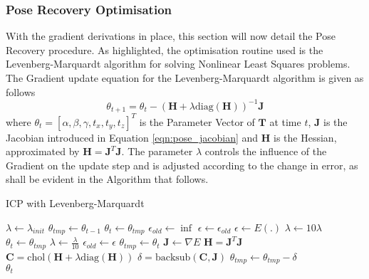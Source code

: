 \subsubsection{Pose Recovery Optimisation}
\label{subsub:moseg_static_camera_poserec_opt}
With the gradient derivations in place, this section will now detail the
Pose Recovery procedure. As highlighted, the optimisation routine used is the
Levenberg-Marquardt\cite{NumericalRecipes} algorithm for solving Nonlinear Least
Squares problems. The Gradient update equation for the Levenberg-Marquardt
algorithm is given as follows
\begin{equation}
  \label{eqn:lm_update}
  \theta_{t+1} = \theta_{t} - (\mathbf{H} + \lambda \text{diag}(\mathbf{H}))^{-1}
  \mathbf{J}
\end{equation}
where $\theta_{t} = [\alpha, \beta, \gamma, t_{x}, t_{y}, t_{z}]^{T}$ is the
Parameter Vector of $\mathbf{T}$ at time $t$, $\mathbf{J}$ is the Jacobian
introduced in Equation \ref{eqn:pose_jacobian} and $\mathbf{H}$ is the Hessian,
approximated by $\mathbf{H} = \mathbf{J}^{T}\mathbf{J}$. The parameter $\lambda$
controls the influence of the Gradient on the update step and is adjusted
according to the change in error, as shall be evident in the Algorithm
that follows.

{
  \centering
  \singlespacing
  \begin{minipage}{.7\linewidth}
    \begin{algorithm}[H]
      \label{alg:icp}
      \caption{ICP with Levenberg-Marquardt}
      \begin{algorithmic}[1]
        \State $\lambda \gets \lambda_{init}$
        \State $\theta_{tmp} \gets \theta_{t-1}$
        \State $\theta_{t} \gets \theta_{tmp}$
        \State $\epsilon_{old} \gets \inf$
        \State $\epsilon \gets \epsilon_{old}$
        \While{$\epsilon >= \tau$}
        \State $\epsilon \gets E(.)$
        \State $\lambda \gets 10\lambda$
        \State $\theta_{t} \gets \theta_{tmp}$
        \Else
        \State $\lambda \gets \frac{\lambda}{10}$
        \State $\epsilon_{old} \gets \epsilon$
        \State $\theta_{tmp} \gets \theta_{t}$
        \EndIf
        \State $\mathbf{J} \gets \nabla E$
        \State $\mathbf{H} = \mathbf{J}^{T}\mathbf{J}$
        \State $\mathbf{C} = \text{chol}(\mathbf{H} +
        \lambda \text{diag}(\mathbf{H}))$
        \State $\delta = \text{backsub}(\mathbf{C}, \mathbf{J})$
        \State $\theta_{tmp} \gets \theta_{tmp} - \delta$
        \EndWhile\\
        \Return $\theta_{t}$
        \EndProcedure
      \end{algorithmic}
    \end{algorithm}
  \end{minipage}
  \par
}

